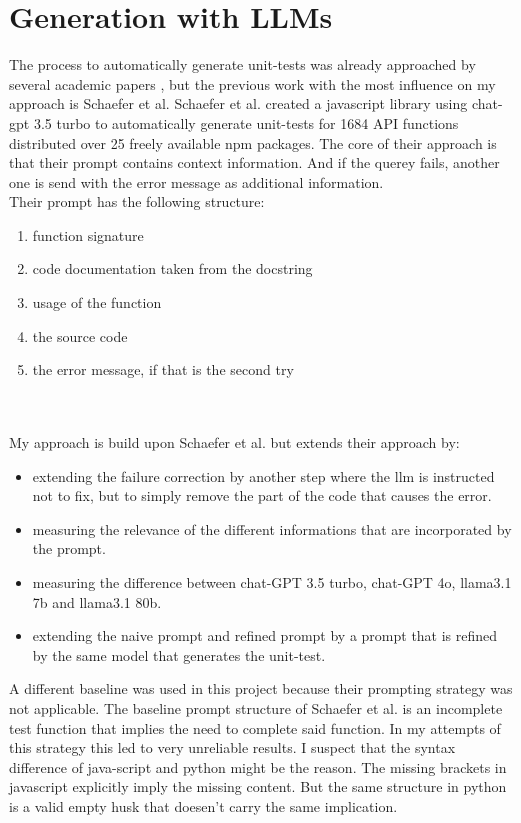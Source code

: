 \documentclass[a4paper,11pt,oneside]{memoir}
\begin{document}
\section{Generation with LLMs}
The process to automatically generate unit-tests was already approached by several academic papers\cite{tufanoTestCaseGeneration} \cite{yang2024empiricalstudyunittest}, but the previous work with the most influence on my approach is Schaefer et al. \cite{Schaefer_automated_unit_test_generation}
Schaefer et al. created a javascript library using chat-gpt 3.5 turbo to automatically generate unit-tests for 1684 API functions distributed over 25 freely available npm packages. The core of their approach is that their prompt contains context information. And if the querey fails, another one is send with the error message as additional information. \\Their prompt has the following structure:
\begin{enumerate}
    \item function signature
    \item code documentation taken from the docstring
    \item usage of the function
    \item the source code
    \item the error message, if that is the second try
\end{enumerate}
\\\\My approach is build upon Schaefer et al. but extends their approach by:
\begin{itemize}
    \item extending the failure correction by another step where the llm is instructed not to fix, but to simply remove the part of the code that causes the error.
    \item measuring the relevance of the different informations that are incorporated by the prompt. 
    \item measuring the difference between chat-GPT 3.5 turbo, chat-GPT 4o, llama3.1 7b and llama3.1 80b.  
    \item extending the naive prompt and refined prompt by a prompt that is refined by the same model that generates the unit-test.
\end{itemize}
A different baseline was used in this project because their prompting strategy was not applicable. The baseline prompt structure of Schaefer et al. is an incomplete test function that implies the need to complete said function. In my attempts of this strategy this led to very unreliable results. I suspect that the syntax difference of java-script and python might be the reason. The missing brackets in javascript explicitly imply the missing content. But the same structure in python is a valid empty husk that doesen't carry the same implication.
\end{document}
